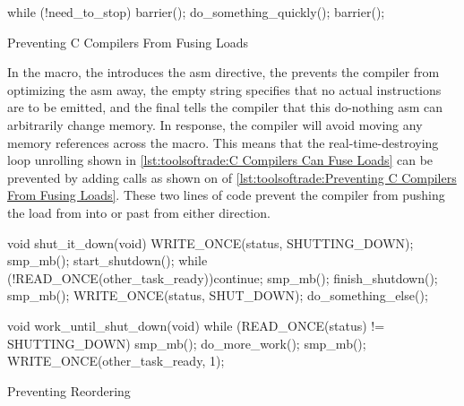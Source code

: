 \begin{listing}
\begin{fcvlabel}
\begin{VerbatimL}[commandchars=\\\[\]]
while (!need_to_stop) {
	barrier(); \lnlbl[b1]
	do_something_quickly();
	barrier(); \lnlbl[b2]
}
\end{VerbatimL}
\end{fcvlabel}
\caption{Preventing C Compilers From Fusing Loads}
\label{lst:toolsoftrade:Preventing C Compilers From Fusing Loads}
\end{listing}

In the  macro, the  introduces the asm
directive, the  prevents the compiler from optimizing
the asm away, the empty string specifies that no actual instructions
are to be emitted, and the final  tells the compiler that
this do-nothing asm can arbitrarily change memory.
In response, the compiler will avoid moving any memory references across
the  macro.
This means that the real-time-destroying loop unrolling shown in
\cref{lst:toolsoftrade:C Compilers Can Fuse Loads}
can be prevented by adding  calls as shown on
of
\cref{lst:toolsoftrade:Preventing C Compilers From Fusing Loads}.
These two lines of code prevent the compiler from pushing the load from
 into or past  from either
direction.

\begin{listing}
\begin{fcvlabel}
\begin{VerbatimL}[commandchars=\\\[\]]
void shut_it_down(void)
{
	WRITE_ONCE(status, SHUTTING_DOWN);
	smp_mb(); \lnlbl[mb1]
	start_shutdown();
	while (!READ_ONCE(other_task_ready))\lnlbl[loop:b]
		continue;
	smp_mb(); \lnlbl[mb2]
	finish_shutdown();
	smp_mb(); \lnlbl[mb3]
	WRITE_ONCE(status, SHUT_DOWN);
	do_something_else();
}

void work_until_shut_down(void)
{
	while (READ_ONCE(status) != SHUTTING_DOWN) {
		smp_mb(); \lnlbl[mb4]
		do_more_work();
	}
	smp_mb(); \lnlbl[mb5]
	WRITE_ONCE(other_task_ready, 1);
}
\end{VerbatimL}
\end{fcvlabel}
\caption{Preventing Reordering}
\label{lst:toolsoftrade:Preventing Reordering}
\end{listing}

